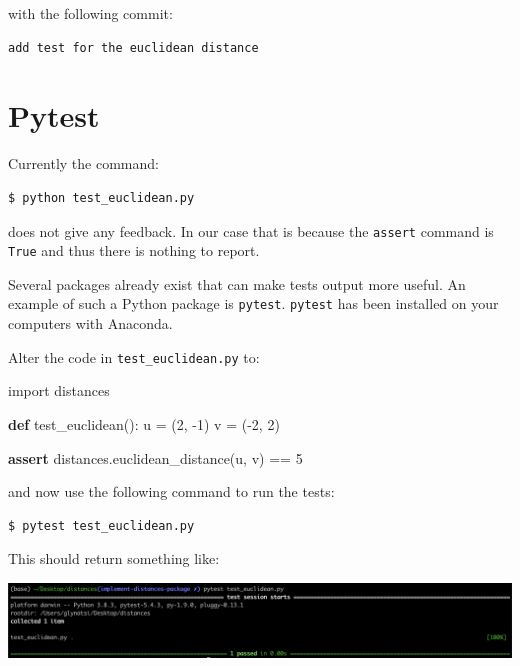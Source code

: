 \documentclass[11pt]{article}
\newenvironment{Shaded}{}{}
\newcommand{\KeywordTok}[1]{\textcolor[rgb]{0.00,0.44,0.13}{\textbf{{#1}}}}
\newcommand{\DecValTok}[1]{\textcolor[rgb]{0.25,0.63,0.44}{{#1}}}
\newcommand{\NormalTok}[1]{{#1}}
\newcommand{\ImportTok}[1]{{#1}}
\newcommand{\ControlFlowTok}[1]{\textcolor[rgb]{0.00,0.44,0.13}{\textbf{{#1}}}}
\newcommand{\OperatorTok}[1]{\textcolor[rgb]{0.40,0.40,0.40}{{#1}}}
\begin{document}
with the following commit:

\begin{verbatim}
add test for the euclidean distance
\end{verbatim}

    \hypertarget{pytest}{%
\section{Pytest}\label{pytest}}

Currently the command:

\begin{verbatim}
$ python test_euclidean.py
\end{verbatim}

does not give any feedback. In our case that is because the
\texttt{assert} command is \texttt{True} and thus there is nothing to
report.

Several packages already exist that can make tests output more useful.
An example of such a Python package is \texttt{pytest}. \texttt{pytest}
has been installed on your computers with Anaconda.

Alter the code in \texttt{test\_euclidean.py} to:

\begin{Shaded}
\begin{Highlighting}[]
\ImportTok{import}\NormalTok{ distances}

\KeywordTok{def}\NormalTok{ test\_euclidean():}
\NormalTok{    u }\OperatorTok{=}\NormalTok{ (}\DecValTok{2}\NormalTok{, }\OperatorTok{{-}}\DecValTok{1}\NormalTok{)}
\NormalTok{    v }\OperatorTok{=}\NormalTok{ (}\OperatorTok{{-}}\DecValTok{2}\NormalTok{, }\DecValTok{2}\NormalTok{)}

    \ControlFlowTok{assert}\NormalTok{ distances.euclidean\_distance(u, v) }\OperatorTok{==} \DecValTok{5}
\end{Highlighting}
\end{Shaded}

and now use the following command to run the tests:

\begin{verbatim}
$ pytest test_euclidean.py
\end{verbatim}

This should return something like:

\includegraphics{static/pytest.png}
\end{document}
